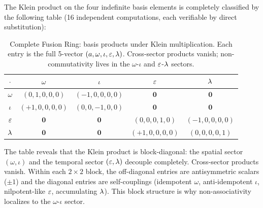 The Klein product on the four indefinite basis elements is completely classified by the following table (16 independent computations, each verifiable by direct substitution):

\begin{table}[!ht]
\centering\small
\caption{Complete Fusion Ring: basis products under Klein multiplication. Each entry is the full 5-vector $(a, \omega, \iota, \varepsilon, \lambda)$. Cross-sector products vanish; non-commutativity lives in the $\omega$-$\iota$ and $\varepsilon$-$\lambda$ sectors.}
\label{tab:fusion}
\begin{tabular}{@{}c|cccc@{}}
\toprule
$\cdot$ & $\omega$ & $\iota$ & $\varepsilon$ & $\lambda$ \\
\midrule
$\omega$ & $(0,1,0,0,0)$ & $(-1,0,0,0,0)$ & $\mathbf{0}$ & $\mathbf{0}$ \\
$\iota$ & $(+1,0,0,0,0)$ & $(0,0,-1,0,0)$ & $\mathbf{0}$ & $\mathbf{0}$ \\
$\varepsilon$ & $\mathbf{0}$ & $\mathbf{0}$ & $(0,0,0,1,0)$ & $(-1,0,0,0,0)$ \\
$\lambda$ & $\mathbf{0}$ & $\mathbf{0}$ & $(+1,0,0,0,0)$ & $(0,0,0,0,1)$ \\
\bottomrule
\end{tabular}
\end{table}

\begin{remark}
The table reveals that the Klein product is block-diagonal: the spatial sector $(\omega, \iota)$ and the temporal sector $(\varepsilon, \lambda)$ decouple completely. Cross-sector products vanish. Within each $2 \times 2$ block, the off-diagonal entries are antisymmetric scalars ($\pm 1$) and the diagonal entries are self-couplings (idempotent $\omega$, anti-idempotent $\iota$, nilpotent-like $\varepsilon$, accumulating $\lambda$). This block structure is why non-associativity localizes to the $\omega$-$\iota$ sector.
\end{remark}

